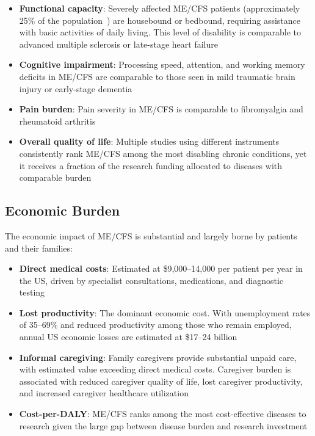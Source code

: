 \begin{itemize}
    \item \textbf{Functional capacity}: Severely affected ME/CFS patients (approximately 25\% of the population~\cite{Pendergrast2020housebound}) are housebound or bedbound, requiring assistance with basic activities of daily living. This level of disability is comparable to advanced multiple sclerosis or late-stage heart failure
    \item \textbf{Cognitive impairment}: Processing speed, attention, and working memory deficits in ME/CFS are comparable to those seen in mild traumatic brain injury or early-stage dementia
    \item \textbf{Pain burden}: Pain severity in ME/CFS is comparable to fibromyalgia and rheumatoid arthritis
    \item \textbf{Overall quality of life}: Multiple studies using different instruments consistently rank ME/CFS among the most disabling chronic conditions, yet it receives a fraction of the research funding allocated to diseases with comparable burden
\end{itemize}

\subsection{Economic Burden}

The economic impact of ME/CFS is substantial and largely borne by patients and their families:

\begin{itemize}
    \item \textbf{Direct medical costs}: Estimated at \$9,000--14,000 per patient per year in the US, driven by specialist consultations, medications, and diagnostic testing~\cite{Jason2017housebound}
    \item \textbf{Lost productivity}: The dominant economic cost. With unemployment rates of 35--69\% and reduced productivity among those who remain employed, annual US economic losses are estimated at \$17--24 billion~\cite{Jason2020economic}
    \item \textbf{Informal caregiving}: Family caregivers provide substantial unpaid care, with estimated value exceeding direct medical costs. Caregiver burden is associated with reduced caregiver quality of life, lost caregiver productivity, and increased caregiver healthcare utilization
    \item \textbf{Cost-per-DALY}: ME/CFS ranks among the most cost-effective diseases to research given the large gap between disease burden and research investment
\end{itemize}

